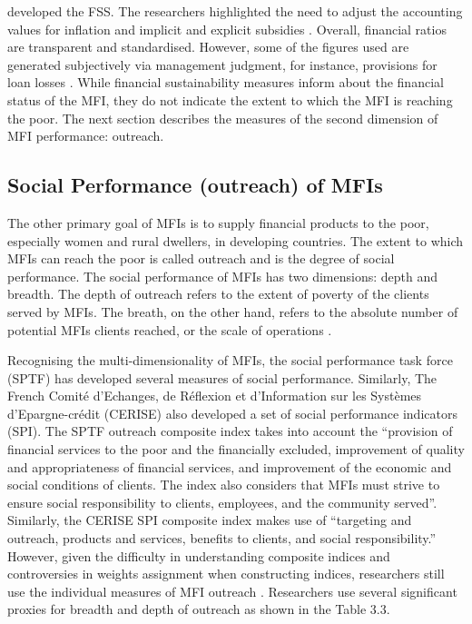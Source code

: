 \documentclass[a4paper,nobind]{templates/ociamthesis}
\begin{document}
\textcite{christen2001commercialization} developed the FSS. The researchers highlighted the need to adjust the accounting values for inflation and implicit and explicit subsidies \autocite{mersland2014microfinance}. Overall, financial ratios are transparent and standardised. However, some of the figures used are generated subjectively via management judgment, for instance, provisions for loan losses \autocite{ehrhardt2016corporate}. While financial sustainability measures inform about the financial status of the MFI, they do not indicate the extent to which the MFI is reaching the poor. The next section describes the measures of the second dimension of MFI performance: outreach.

\hypertarget{social-performance-outreach-of-mfis}{%
\subsection{Social Performance (outreach) of MFIs}\label{social-performance-outreach-of-mfis}}

The other primary goal of MFIs is to supply financial products to the poor, especially women and rural dwellers, in developing countries. The extent to which MFIs can reach the poor is called outreach and is the degree of social performance. The social performance of MFIs has two dimensions: depth and breadth. The depth of outreach refers to the extent of poverty of the clients served by MFIs. The breath, on the other hand, refers to the absolute number of potential MFIs clients reached, or the scale of operations \autocite{bibi2018new}.

Recognising the multi-dimensionality of MFIs, the social performance task force (SPTF) has developed several measures of social performance. Similarly, The French Comité d'Echanges, de Réflexion et d'Information sur les Systèmes d'Epargne-crédit (CERISE) also developed a set of social performance indicators (SPI)\autocite{mersland2014microfinance}. The SPTF outreach composite index takes into account the ``provision of financial services to the poor and the financially excluded, improvement of quality and appropriateness of financial services, and improvement of the economic and social conditions of clients. The index also considers that MFIs must strive to ensure social responsibility to clients, employees, and the community served''\autocite{mersland2009performance}. Similarly, the CERISE SPI composite index makes use of ``targeting and outreach, products and services, benefits to clients, and social responsibility.'' However, given the difficulty in understanding composite indices and controversies in weights assignment when constructing indices, researchers still use the individual measures of MFI outreach \autocite{chattopadhyay2017applicability}. Researchers use several significant proxies for breadth and depth of outreach as shown in the Table 3.3.
\end{document}

